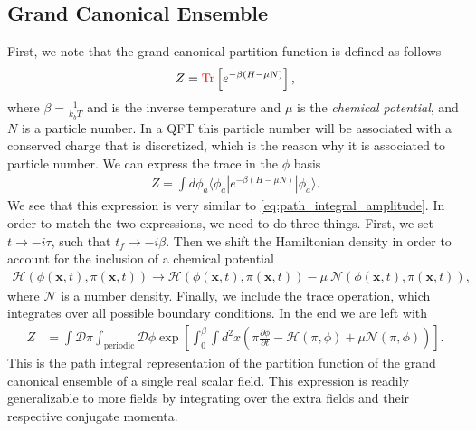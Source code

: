         \subsection{Grand Canonical Ensemble} \label{GCE_sec}
        First, we note that the grand canonical partition function is defined as follows
        \begin{align}
            Z= \textcolor{red}{\mathrm{Tr}} \left[e^{-\beta \left( H - \mu N \right)}\right],
        \end{align}
        where $\beta = \frac{1}{k_b T}$ and is the inverse temperature and $\mu$ is the \textit{chemical potential}, and $N$ is a particle number. In a QFT this particle number will be associated with a conserved charge that is discretized, which is the reason why it is associated to particle number. We can express the trace in the $\phi$ basis
        \begin{align}
            Z= \int d \phi_a \langle \phi_a | e^{-\beta \left( H - \mu N \right)} | \phi_a \rangle.
        \end{align}
        We see that this expression is very similar to \ref{eq:path_integral_amplitude}. In order to match the two expressions, we need to do three things. First, we set $t \rightarrow -i \tau$, such that $t_f \rightarrow -i \beta$. Then we shift the Hamiltonian density in order to account for the inclusion of a chemical potential
        \begin{align}
            \mathcal{H} \left(\phi(\bm{x},t),\pi (\bm{x},t) \right) \rightarrow \mathcal{H}\left(\phi(\bm{x},t),\pi (\bm{x},t) \right) - \mu \ \mathcal{N}\left(\phi(\bm{x},t),\pi (\bm{x},t) \right),
        \end{align}
        where $\mathcal{N}$ is a number density. Finally, we include the trace operation, which integrates over all possible boundary conditions. In the end we are left with
        \begin{align}
            Z &= \int \mathcal{D} \pi \int_{\text{periodic}} \mathcal{D} \phi \exp \left[ \int_0^{\beta} \int d^2x \left(\pi \frac{\partial \phi}{\partial t} - \mathcal{H}(\pi, \phi) + \mu \mathcal{N}(\pi, \phi) \right) \right] \label{eq:partition_function}.
        \end{align}
This is the path integral representation of the partition function of the grand canonical ensemble of a single real scalar field. This expression is readily generalizable to more fields by integrating over the extra fields and their respective conjugate momenta.

